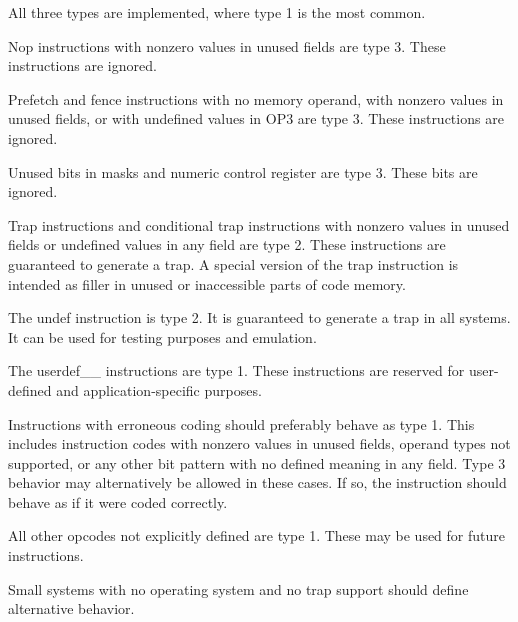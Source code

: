 \documentclass[forwardcom.tex]{subfiles}
\begin{document}
All three types are implemented, where type 1 is the most common.
\vspace{2mm}

Nop instructions with nonzero values in unused fields are type 3. These instructions are ignored.
\vspace{2mm}

Prefetch and fence instructions with no memory operand, with nonzero values in unused fields, or with undefined values in OP3 are type 3. These instructions are ignored.
\vspace{2mm}

Unused bits in masks and numeric control register are type 3. These bits are ignored.
\vspace{2mm}

Trap instructions and conditional trap instructions with nonzero values in unused fields or undefined values in any field are type 2. These instructions are guaranteed to generate a trap. A special version of the trap instruction is intended as filler in unused or inaccessible parts of code memory.
\vspace{2mm}

The undef instruction is type 2. It is guaranteed to generate a trap in all systems. It can be used for testing purposes and emulation.
\vspace{2mm}

The userdef\_\_ instructions are type 1. These instructions are reserved for user-defined and application-specific purposes.
\vspace{2mm}

Instructions with erroneous coding should preferably behave as type 1. This includes instruction codes with nonzero values in unused fields, operand types not supported, or any other bit pattern with no defined meaning in any field. Type 3 behavior may alternatively be allowed in these cases. If so, the instruction should behave as if it were coded correctly.
\vspace{2mm}

All other opcodes not explicitly defined are type 1. These may be used for future instructions.
\vspace{2mm}

Small systems with no operating system and no trap support should define alternative behavior.

 
\end{document}
